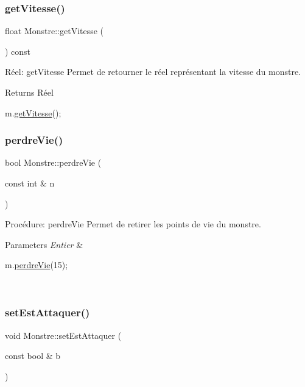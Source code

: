 \subsubsection{\texorpdfstring{get\+Vitesse()}{getVitesse()}}
{\footnotesize\ttfamily float Monstre\+::get\+Vitesse (\begin{DoxyParamCaption}{ }\end{DoxyParamCaption}) const}



Réel\+: get\+Vitesse Permet de retourner le réel représentant la vitesse du monstre. 

\begin{DoxyReturn}{Returns}
Réel 
\begin{DoxyCode}
m.\hyperlink{classMonstre_a8f94de3aed809fd81f283afce7c3feba}{getVitesse}();
\end{DoxyCode}
 
\end{DoxyReturn}
\mbox{\label{classMonstre_af6d0a1f276465d12d50db387855e62d3}} 
\subsubsection{\texorpdfstring{perdre\+Vie()}{perdreVie()}}
{\footnotesize\ttfamily bool Monstre\+::perdre\+Vie (\begin{DoxyParamCaption}\item[{const int \&}]{n }\end{DoxyParamCaption})}



Procédure\+: perdre\+Vie Permet de retirer les points de vie du monstre. 


\begin{DoxyParams}{Parameters}
{\em Entier} & 
\begin{DoxyCode}
m.\hyperlink{classMonstre_af6d0a1f276465d12d50db387855e62d3}{perdreVie}(15);
\end{DoxyCode}
 \\
\hline
\end{DoxyParams}
\mbox{\label{classMonstre_af426bb7333d4b59352997435b4b6f890}} 
\subsubsection{\texorpdfstring{set\+Est\+Attaquer()}{setEstAttaquer()}}
{\footnotesize\ttfamily void Monstre\+::set\+Est\+Attaquer (\begin{DoxyParamCaption}\item[{const bool \&}]{b }\end{DoxyParamCaption})}



